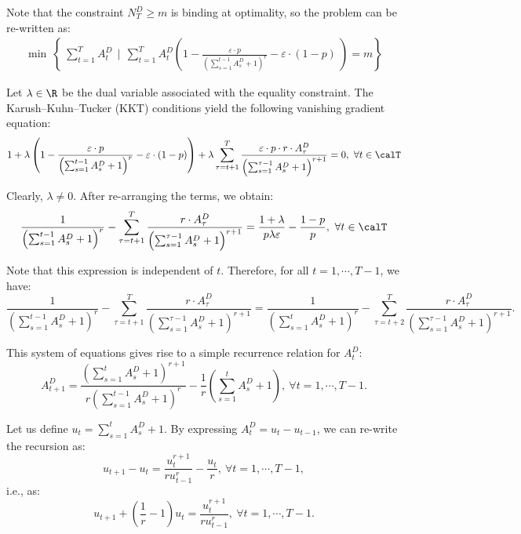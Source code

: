 \documentclass[blindrev]{informs3noheader}
\begin{document}
Note that the constraint $N^D_T\geq m$ is binding at optimality, so the problem can be re-written as:
\begin{align*}
\min\ \left\{\ \sum_{t=1}^T A^D_t \ \ \bigg|\ \ \sum_{t=1}^TA^D_t \left(1 - \frac{\varepsilon\cdot p}{\left(\sum_{s=1}^{t-1} A^D_s +1\right)^r} - \varepsilon\cdot(1-p)\ \right)=m\right\}
\end{align*}

Let $\lambda\in\R$ be the dual variable associated with the equality constraint. The Karush–Kuhn–Tucker (KKT) conditions yield the following vanishing gradient equation:
$$1+\lambda\left(1 - \frac{\varepsilon\cdot p}{\left(\sum_{s=1}^{t-1} A^D_s +1\right)^r} - \varepsilon\cdot(1-p)\right)+\lambda\sum_{\tau=t+1}^T\frac{\varepsilon\cdot p\cdot r\cdot A^D_\tau}{\left(\sum_{s=1}^{\tau-1} A^D_s +1\right)^{r+1}}=0,\ \forall t\in\calT$$

Clearly, $\lambda\neq0$. After re-arranging the terms, we obtain:
$$\frac{1}{\left(\sum_{s=1}^{t-1} A^D_s +1\right)^r}-\sum_{\tau=t+1}^T\frac{r\cdot A^D_\tau}{\left(\sum_{s=1}^{\tau-1} A^D_s +1\right)^{r+1}}=\frac{1+\lambda}{p\lambda\varepsilon} - \frac{1-p}{p},\ \forall t\in\calT$$

Note that this expression is independent of $t$. Therefore, for all $t=1,\cdots,T-1$, we have:
$$\frac{1}{\left(\sum_{s=1}^{t-1} A^D_s +1\right)^r}-\sum_{\tau=t+1}^T\frac{ r\cdot A^D_\tau}{\left(\sum_{s=1}^{\tau-1} A^D_s +1\right)^{r+1}}=\frac{1}{\left(\sum_{s=1}^{t} A^D_s +1\right)^r}-\sum_{\tau=t+2}^T\frac{r\cdot A^D_\tau}{\left(\sum_{s=1}^{\tau-1} A^D_s +1\right)^{r+1}}.$$

This system of equations gives rise to a simple recurrence relation for $A^D_{t}$:
\begin{equation*}
A^D_{t+1} = \frac{\left(\sum_{s=1}^{t} A^D_s +1\right)^{r+1}}{r\left(\sum_{s=1}^{t-1} A^D_s +1\right)^r} - \frac{1}{r}\left(\sum_{s=1}^{t} A^D_s +1\right),\ \forall t=1,\cdots,T-1.
\end{equation*}

Let us define $u_t = \sum_{s=1}^t A^D_s + 1$. By expressing $A^D_t=u_t-u_{t-1}$, we can re-write the recursion as:
\begin{equation*}
u_{t+1} - u_t = \frac{u_t^{r+1}}{ru_{t-1}^r}-\frac{u_t}{r},\ \forall t=1,\cdots,T-1,
\end{equation*}
i.e., as:
\begin{equation}
u_{t+1} + \left(\frac{1}{r}-1\right)u_t = \frac{u_t^{r+1}}{ru_{t-1}^r},\ \forall t=1,\cdots,T-1. \label{eq:recur_rel}
\end{equation}
\end{document}
